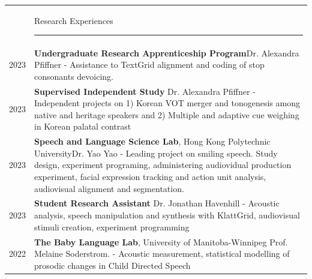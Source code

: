 \documentclass[letterpaper, 11pt]{article}
\newcommand{\headingfont}{\Large\color{black}}
\newenvironment{SectionTable}[1]{
	\renewcommand*{\arraystretch}{1.3}
	\setlength{\tabcolsep}{10pt}
	\begin{longtable}{Rp{6.3in}} & #1 \vspace{0.13cm}\hrule\\[0.6em]}
{\end{longtable}\vspace{-.3cm}}
\begin{document}
\begin{SectionTable}{\headingfont Research Experiences}

 2023 &
 \textbf{Undergraduate Research Apprenticeship Program}\hfill Dr. Alexandra Pfiffner \newline
	- Assistance to TextGrid alignment and coding of stop consonants devoicing.\\
	2023&
	\textbf{Supervised Independent Study} \hfill Dr. Alexandra Pfiffner \newline 
	- Independent projects on 1) Korean VOT merger and tonogenesis among native and heritage speakers and 2) Multiple and adaptive cue weighing in Korean palatal contrast \\

2023 &
	\textbf{Speech and Language Science Lab}, Hong Kong Polytechnic University\hfill Dr. Yao Yao\newline 
	- Leading project on smiling speech. Study design, experiment programing, administering audiovidual production experiment, facial expression tracking and action unit analysis, audiovisual alignment and segmentation.\\
2023 &
\textbf{Student Research Assistant} \hfill Dr. Jonathan Havenhill \newline
	- Acoustic analysis, speech manipulation and synthesis with KlattGrid, audiovisual stimuli creation, experiment programming\\

2022 &
\textbf{The Baby Language Lab}, University of Manitoba-Winnipeg \hfill Prof. Melaine Soderstrom. \newline
	- Acoustic measurement, statistical modelling of prosodic changes in Child Directed Speech\\


\end{SectionTable}
\end{document}
